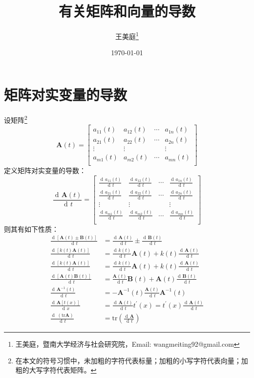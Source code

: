\documentclass[UTF8,space=auto]{ctexart} %
\title{
	有关矩阵和向量的导数
}
\author{王美庭\thanks{王美庭，暨南大学经济与社会研究院，Email: wangmeiting92@gmail.com}}
\date{\today}
\DeclareMathOperator{\diff}{d\!}
\begin{document}
\maketitle

\tableofcontents

\section{矩阵对实变量的导数}
设矩阵\footnote{在本文的符号习惯中，未加粗的字符代表标量；加粗的小写字符代表向量；加粗的大写字符代表矩阵。}
\[
\mathbf{A}(t) =
\begin{bmatrix}
	a_{11}(t) & a_{12}(t) & \cdots & a_{1n}(t) \\
	a_{21}(t) & a_{22}(t) & \cdots & a_{2n}(t) \\
	\vdots & \vdots & & \vdots \\
	a_{m1}(t) & a_{m2}(t) & \cdots & a_{mn}(t) \\
\end{bmatrix}
\]
定义矩阵对实变量的导数：
\[
\frac{\diff \mathbf{A}(t)}{\diff t} =
\begin{bmatrix}
	\frac{\diff a_{11}(t)}{\diff t} & \frac{\diff a_{12}(t)}{\diff t} & \cdots & \frac{\diff a_{1n}(t)}{\diff t} \\
	\frac{\diff a_{21}(t)}{\diff t} & \frac{\diff a_{22}(t)}{\diff t} & \cdots & \frac{\diff a_{2n}(t)}{\diff t} \\
	\vdots & \vdots & & \vdots \\
	\frac{\diff a_{m1}(t)}{\diff t} & \frac{\diff a_{m2}(t)}{\diff t} & \cdots & \frac{\diff a_{mn}(t)}{\diff t} \\
\end{bmatrix}
\]
则其有如下性质：
\begin{align}
\frac{\diff \left[ \mathbf{A}(t) \pm \mathbf{B}(t) \right]}{\diff t} &= \frac{\diff \mathbf{A}(t)}{\diff t} \pm \frac{\diff \mathbf{B}(t)}{\diff t} \\
\frac{\diff \left[ k(t) \mathbf{A}(t) \right]}{\diff t} &= \frac{\diff k(t)}{\diff t} \mathbf{A}(t) + k(t) \frac{\diff \mathbf{A}(t)}{\diff t} \\
\frac{\diff \left[ k(t) \mathbf{A}(t) \right]}{\diff t} &= \frac{\diff k(t)}{\diff t} \mathbf{A}(t) + k(t) \frac{\diff \mathbf{A}(t)}{\diff t} \\
\frac{\diff \left[ \mathbf{A}(t)\mathbf{B}(t) \right]}{\diff t} &= \frac{\mathbf{A}(t)}{\diff t} \mathbf{B}(t) + \mathbf{A}(t) \frac{\diff \mathbf{B}(t)}{\diff t} \\
\frac{\diff \mathbf{A}^{-1}(t)}{\diff t} &= - \mathbf{A}^{-1}(t) \frac{\mathbf{A}(t)}{\diff t} \mathbf{A}^{-1}(t) \\
\frac{\diff \mathbf{A}[t(x)]}{\diff x} &= \frac{\diff \mathbf{A}(t)}{\diff t} t^{\prime}(x) = t^{\prime}(x) \frac{\diff \mathbf{A}(t)}{\diff t} \\
\frac{\diff\,(\mathrm{tr}\mathbf{A})}{\diff t} &= \mathrm{tr}\left( \frac{\diff\mathbf{A}}{\diff t} \right)
\end{align}
\end{document}
